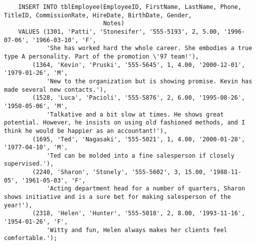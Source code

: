 \documentclass[12pt,titlepage]{article}
\begin{document}
\begin{verbatim}
    INSERT INTO tblEmployee(EmployeeID, FirstName, LastName, Phone, TitleID, CommissionRate, HireDate, BirthDate, Gender,
                            Notes)
    VALUES (1301, 'Patti', 'Stonesifer', '555-5193', 2, 5.00, '1996-07-06', '1966-03-10', 'F',
            'She has worked hard the whole career. She embodies a true type A personality. Part of the promotion \'97 team!'),
        (1364, 'Kevin', 'Pruski', '555-5645', 1, 4.00, '2000-12-01', '1979-01-26', 'M',
            'New to the organization but is showing promise. Kevin has made several new contacts.'),
        (1528, 'Luca', 'Pacioli', '555-5876', 2, 6.00, '1995-08-26', '1950-05-06', 'M',
            'Talkative and a bit slow at times. He shows great potential. However, he insists on using old fashioned methods, and I think he would be happier as an accountant!'),
        (1695, 'Ted', 'Nagasaki', '555-5021', 1, 4.00, '2000-01-28', '1977-04-10', 'M',
            'Ted can be molded into a fine salesperson if closely supervised.'),
        (2240, 'Sharon', 'Stonely', '555-5602', 3, 15.00, '1988-11-05', '1961-05-03', 'F',
            'Acting department head for a number of quarters, Sharon shows initiative and is a sure bet for making salesperson of the year!'),
        (2318, 'Helen', 'Hunter', '555-5018', 2, 8.00, '1993-11-16', '1954-01-26', 'F',
            'Witty and fun, Helen always makes her clients feel comfortable.');


\end{verbatim}
\end{document}
